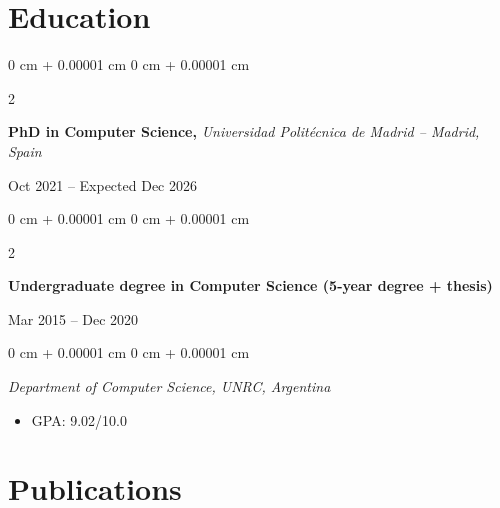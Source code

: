 \documentclass[10pt, letterpaper]{article}
\newenvironment{highlights}{
    \begin{itemize}[
        topsep=0.10 cm,
        parsep=0.10 cm,
        partopsep=0pt,
        itemsep=0pt,
        leftmargin=0 cm + 10pt
    ]
}{
    \end{itemize}
} %
\newenvironment{onecolentry}{
    \begin{adjustwidth}{
        0 cm + 0.00001 cm
    }{
        0 cm + 0.00001 cm
    }
}{
    \end{adjustwidth}
} %
\newenvironment{twocolentry}[2][]{
    \onecolentry
    \def\secondColumn{#2}
    \setcolumnwidth{\fill, 4.5 cm}
    \begin{paracol}{2}
}{
    \switchcolumn \raggedleft \secondColumn
    \end{paracol}
    \endonecolentry
} %
\begin{document}
    \vspace{0.1 cm}

    \section{Education}

        \vspace{0.1 cm}

        \begin{twocolentry}{
            Oct 2021 -- Expected Dec 2026
        }
            \textbf{PhD in Computer Science,} \textit{Universidad Politécnica de Madrid -- Madrid, Spain}
        \end{twocolentry}

        \vspace{0.2 cm}

        \begin{twocolentry}{
            Mar 2015 -- Dec 2020
        }
            \textbf{Undergraduate degree in Computer Science (5-year degree +
            thesis)}
        \end{twocolentry}

        \begin{onecolentry}
            \textit{Department of Computer Science, UNRC, Argentina}
            \begin{highlights}
                \item GPA: 9.02/10.0
            \end{highlights}
        \end{onecolentry}



\vspace{0.1 cm}

    \section{Publications}

        \vspace{0.1 cm}
\end{document}
